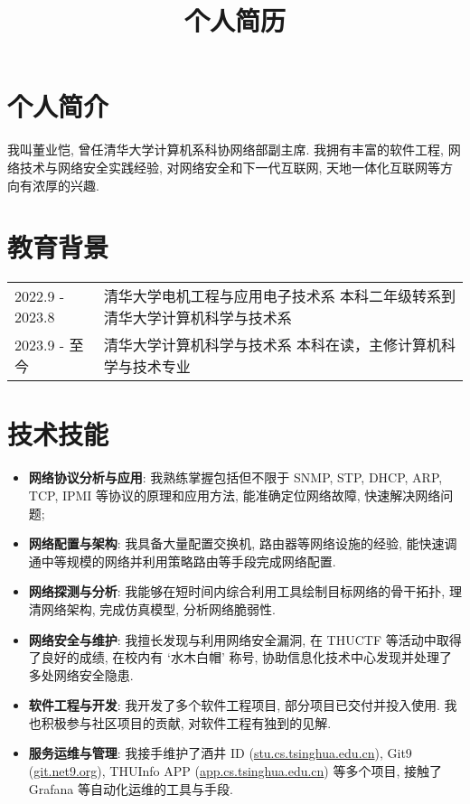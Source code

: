 \documentclass[a4paper, 10pt]{article}
\title{个人简历}
\date{}
\begin{document}
\setlength{\droptitle}{-6em}
\maketitle
\vspace{-4em}

\section*{个人简介}
我叫董业恺, 曾任清华大学计算机系科协网络部副主席. 我拥有丰富的软件工程, 网络技术与网络安全实践经验, 对网络安全和下一代互联网, 天地一体化互联网等方向有浓厚的兴趣.

\section*{教育背景}
\noindent
\begin{tabular}{p{}p{}}
    2022.9 - 2023.8 & 清华大学电机工程与应用电子技术系 \newline
        \fontsize{8pt}{10pt}\selectfont 本科二年级转系到清华大学计算机科学与技术系 \\

    2023.9 - 至今 & 清华大学计算机科学与技术系 \newline
        \fontsize{8pt}{10pt}\selectfont 本科在读，主修计算机科学与技术专业 \\
\end{tabular}

\section*{技术技能}
\begin{itemize}[left=0pt]
    \item \textbf{网络协议分析与应用}: 我熟练掌握包括但不限于 SNMP, STP, DHCP, ARP, TCP, IPMI 等协议的原理和应用方法, 能准确定位网络故障, 快速解决网络问题;
    \item \textbf{网络配置与架构}: 我具备大量配置交换机, 路由器等网络设施的经验, 能快速调通中等规模的网络并利用策略路由等手段完成网络配置.
    \item \textbf{网络探测与分析}: 我能够在短时间内综合利用工具绘制目标网络的骨干拓扑, 理清网络架构, 完成仿真模型, 分析网络脆弱性.
    \item \textbf{网络安全与维护}: 我擅长发现与利用网络安全漏洞, 在 THUCTF 等活动中取得了良好的成绩, 在校内有 `水木白帽' 称号, 协助信息化技术中心发现并处理了多处网络安全隐患.
    \item \textbf{软件工程与开发}: 我开发了多个软件工程项目, 部分项目已交付并投入使用. 我也积极参与社区项目的贡献, 对软件工程有独到的见解.
    \item \textbf{服务运维与管理}: 我接手维护了酒井 ID (\href{https://stu.cs.tsinghua.edu.cn}{stu.cs.tsinghua.edu.cn}), Git9 (\href{https://git.net9.org}{git.net9.org}), THUInfo APP (\href{https://app.cs.tsinghua.edu.cn}{app.cs.tsinghua.edu.cn}) 等多个项目, 接触了 Grafana 等自动化运维的工具与手段.
\end{itemize}
\end{document}
